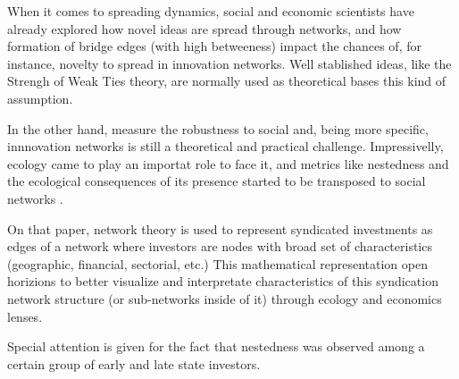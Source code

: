 When it comes to spreading dynamics, social and economic scientists have already explored how novel ideas are spread through networks, and how formation of bridge edges (with high betweeness) impact the chances of, for instance, novelty to spread in innovation networks. Well stablished ideas, like the Strengh of Weak Ties theory, are normally used as theoretical bases this kind of assumption.

In the other hand, measure the robustness to social and, being more specific, innnovation networks is still a theoretical and practical challenge. Impressivelly, ecology came to play an importat role to face it, and metrics like nestedness and the ecological consequences of its presence started to be transposed to social networks \cite{Theophile2024}.

On that paper, network theory is used to represent syndicated investments as edges of a network where investors are nodes with broad set of characteristics (geographic, financial, sectorial, etc.) This mathematical representation open horizions to better visualize and interpretate characteristics of this syndication network structure (or sub-networks inside of it) through ecology and economics lenses. 

Special attention is given for the fact that nestedness was observed among a certain group of early and late state investors.

